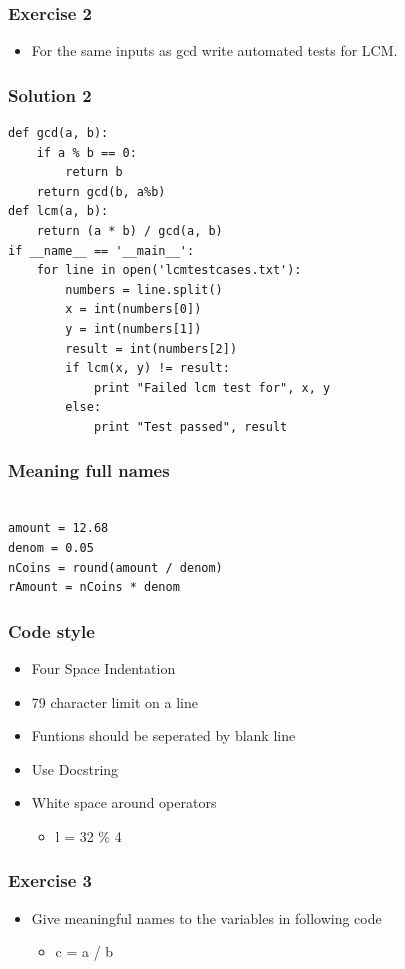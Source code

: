 \documentclass[presentation]{beamer}
\begin{document}
\begin{frame}
\frametitle{Exercise 2}
\label{sec-10}


\begin{itemize}
\item For the same inputs as gcd write automated tests for LCM.
\end{itemize}
\end{frame}
\begin{frame}[fragile]
\frametitle{Solution 2}
\label{sec-11}

\lstset{language=Python}
\begin{lstlisting}
def gcd(a, b):
    if a % b == 0: 
        return b
    return gcd(b, a%b)
def lcm(a, b):
    return (a * b) / gcd(a, b)
if __name__ == '__main__':
    for line in open('lcmtestcases.txt'):
        numbers = line.split()
        x = int(numbers[0])
        y = int(numbers[1])
        result = int(numbers[2])
        if lcm(x, y) != result:
            print "Failed lcm test for", x, y
        else:
            print "Test passed", result
\end{lstlisting}
\end{frame}
\begin{frame}[fragile]
\frametitle{Meaning full names}
\label{sec-12}

\lstset{language=Python}
\begin{lstlisting}

amount = 12.68
denom = 0.05
nCoins = round(amount / denom)
rAmount = nCoins * denom
\end{lstlisting}
\end{frame}
\begin{frame}
\frametitle{Code style}
\label{sec-13}


\begin{itemize}
\item Four Space Indentation
\item 79 character limit on a line
\item Funtions should be seperated by 
   blank line
\item Use Docstring
\item White space around operators
\begin{itemize}
\item l = 32 \% 4
\end{itemize}
\end{itemize}
\end{frame}
\begin{frame}
\frametitle{Exercise 3}
\label{sec-14}


\begin{itemize}
\item Give meaningful names to the variables in following
     code
\begin{itemize}
\item c = a / b
\end{itemize}
\end{itemize}
\end{frame}
\end{document}
